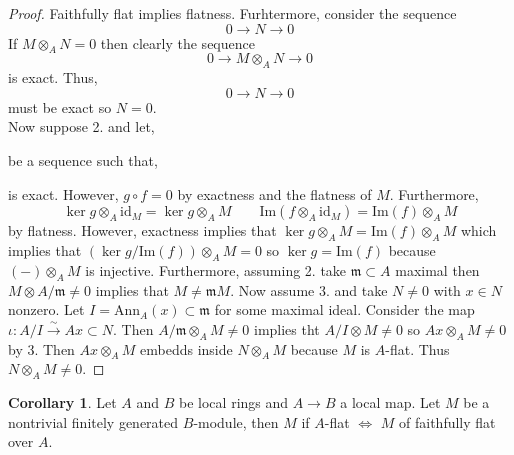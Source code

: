 \documentclass[12pt]{article}
\renewcommand{\Im}[1]{\mathrm{Im}(#1)}
\newcommand{\id}{\mathrm{id}}
\newcommand{\Ann}[2]{\mathrm{Ann}_{#1}\left(#2\right)}
\newcommand{\m}{\mathfrak{m}}
\theoremstyle{remark}
\theoremstyle{definition}
\newtheorem{corollary}[theorem]{Corollary}
\begin{document}
\begin{proof}
Faithfully flat implies flatness. Furhtermore, consider the sequence 
\[ 0 \to N \to 0 \]
If $M \otimes_A N = 0$ then clearly the sequence 
\[ 0 \to M \otimes_A N \to 0\]
is exact. Thus, 
\[ 0 \to N \to 0 \] must be exact so $N = 0$. 
\bigskip\\
Now suppose 2. and let,
\begin{center}
\end{center}
be a sequence such that,
\begin{center}
\end{center}
is exact. However, $g \circ f = 0$ by exactness and the flatness of $M$. Furthermore, 
\[ \ker{g \otimes_A \id_M} = \ker{g} \otimes_A M \quad \quad \Im{f \otimes_A \id_M} = \Im{f} \otimes_A M \]
by flatness. However, exactness implies that $\ker{g} \otimes_A M = \Im{f} \otimes_A M$ which implies that $(\ker{g} / \Im{f}) \otimes_A M  = 0$ so $\ker{g} = \Im{f}$ because $(-) \otimes_A M$ is injective. Furthermore, assuming 2. take $\m \subset A$ maximal then $M \otimes A / \m \neq 0$ implies that $M \neq \m M$. Now assume 3. and take $N \neq 0$ with $x \in N$ nonzero. Let $I = \Ann{A}{x} \subset \m$ for some maximal ideal. Consider the map $\iota : A / I \xrightarrow{\sim} A x \subset N$. Then $A / \m \otimes_A M \neq 0$ implies tht $A / I \otimes M \neq 0$ so $A x \otimes_A M \neq 0$ by 3. Then $A x \otimes_A M$ embedds inside $N \otimes_A M$ because $M$ is $A$-flat. Thus $N \otimes_A M \neq 0$. 
\end{proof}

\begin{corollary}
Let $A$ and $B$ be local rings and $A \to B$ a local map. Let $M$ be a nontrivial finitely generated $B$-module, then $M$ if $A$-flat $\iff$ $M$ of faithfully flat over $A$.
\end{corollary}
\end{document}
